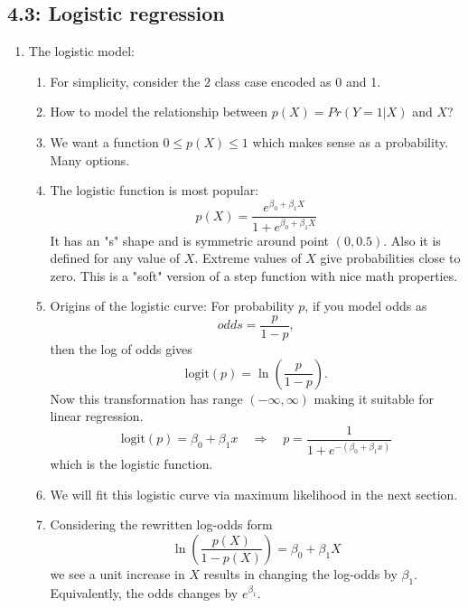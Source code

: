 \documentclass{article}
\begin{document}
\subsection*{4.3: Logistic regression}

\begin{enumerate}
\item The logistic model:
\begin{enumerate}
\item For simplicity, consider the 2 class case encoded as 0 and 1.
\item How to model the relationship between $p(X) = Pr(Y=1|X)$ and $X$?
\item We want a function $0 \leq p(X) \leq 1$ which makes sense as a probability. Many options.
\item The logistic function is most popular:
\[
p(X) = \frac{e^{\beta_0 + \beta_1 X}}{1 + e^{\beta_0 + \beta_1 X}}
\]
It has an "s" shape and is symmetric around point $(0, 0.5)$. Also it is defined for any value of $X$. Extreme values of $X$ give probabilities close to zero. This is a "soft" version of a step function with nice math properties.
\item Origins of the logistic curve: For probability $p$, if you model odds as
\[
odds = \frac{p}{1-p},
\]
then the log of odds gives
\[
\text{logit}(p) = \ln\left( \frac{p}{1-p} \right).
\]
Now this transformation has range $(-\infty, \infty)$ making it suitable for linear regression.
\[
\text{logit}(p) = \beta_0 + \beta_1 x \quad \Rightarrow \quad p = \frac{1}{1 + e^{-(\beta_0 + \beta_1 x)}}
\]
which is the logistic function.
\item We will fit this logistic curve via maximum likelihood in the next section.
\item Considering the rewritten log-odds form
\[
\ln\left( \frac{p(X)}{1-p(X)}\right) = \beta_0 + \beta_1 X
\]
we see a unit increase in $X$ results in changing the log-odds by $\beta_1$. Equivalently, the odds changes by $e^{\beta_1}$. 
\end{enumerate}


\end{enumerate}
\end{document}
